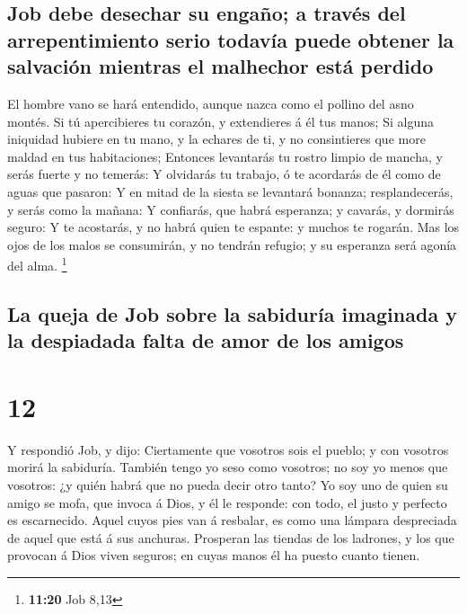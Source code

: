 \hypertarget{job-debe-desechar-su-engauxf1o-a-travuxe9s-del-arrepentimiento-serio-todavuxeda-puede-obtener-la-salvaciuxf3n-mientras-el-malhechor-estuxe1-perdido}{%
\subsection{Job debe desechar su engaño; a través del arrepentimiento
serio todavía puede obtener la salvación mientras el malhechor está
perdido}\label{job-debe-desechar-su-engauxf1o-a-travuxe9s-del-arrepentimiento-serio-todavuxeda-puede-obtener-la-salvaciuxf3n-mientras-el-malhechor-estuxe1-perdido}}

 El hombre vano se hará entendido, aunque nazca como el
pollino del asno montés.  Si tú apercibieres tu corazón,
y extendieres á él tus manos;  Si alguna iniquidad
hubiere en tu mano, y la echares de ti, y no consintieres que more
maldad en tus habitaciones;  Entonces levantarás tu
rostro limpio de mancha, y serás fuerte y no temerás:  Y
olvidarás tu trabajo, ó te acordarás de él como de aguas que pasaron:
 Y en mitad de la siesta se levantará bonanza;
resplandecerás, y serás como la mañana:  Y confiarás, que
habrá esperanza; y cavarás, y dormirás seguro:  Y te
acostarás, y no habrá quien te espante: y muchos te rogarán.
 Mas los ojos de los malos se consumirán, y no tendrán
refugio; y su esperanza será agonía del alma. \footnote{\textbf{11:20}
  Job 8,13}

\hypertarget{la-queja-de-job-sobre-la-sabiduruxeda-imaginada-y-la-despiadada-falta-de-amor-de-los-amigos}{%
\subsection{La queja de Job sobre la sabiduría imaginada y la despiadada
falta de amor de los
amigos}\label{la-queja-de-job-sobre-la-sabiduruxeda-imaginada-y-la-despiadada-falta-de-amor-de-los-amigos}}

\hypertarget{section-11}{%
\section{12}\label{section-11}}

 Y respondió Job, y dijo:  Ciertamente que
vosotros sois el pueblo; y con vosotros morirá la sabiduría.
 También tengo yo seso como vosotros; no soy yo menos que
vosotros: ¿y quién habrá que no pueda decir otro tanto? 
Yo soy uno de quien su amigo se mofa, que invoca á Dios, y él le
responde: con todo, el justo y perfecto es escarnecido. 
Aquel cuyos pies van á resbalar, es como una lámpara despreciada de
aquel que está á sus anchuras.  Prosperan las tiendas de
los ladrones, y los que provocan á Dios viven seguros; en cuyas manos él
ha puesto cuanto tienen.

